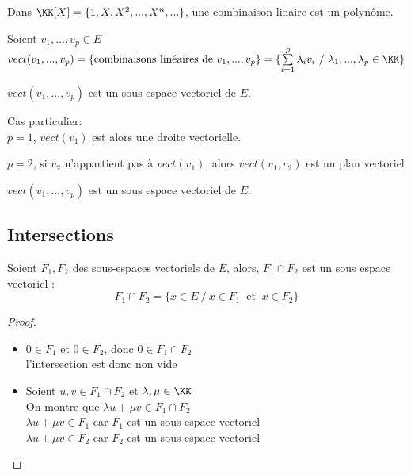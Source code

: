 \documentclass[../main.tex]{subfile}
\begin{document}
\begin{ex}
	Dans $\KK[X] = \{1, X, X^2, ..., X^n, ...\}$, une combinaison linaire est un polynôme.
\end{ex}

\begin{defi}
	Soient $v_1, ..., v_p \in E$\\
	$vect(v_1, ..., v_p) = \{\text{combinaisons linéaires de $v_1, ..., v_p$}\} = \{\sum\limits_{i=1}^p \lambda_i v_i \ / \ \lambda_1, ..., \lambda_p \in \KK\}$
\end{defi}

\begin{prop}
	$vect(v_1, ..., v_p)$ est un sous espace vectoriel de $E$.
\end{prop}

\begin{ex}
	Cas particulier:\\
	$p = 1$, $vect(v_1)$ est alors une droite vectorielle.\\
\begin{center}	
	\def\svgwidth{0.3\textwidth}
	
\end{center}
	$p=2$, si $v_2$ n'appartient pas à $vect(v_1)$, alors $vect(v_1, v_2)$ est un plan vectoriel
\begin{center}	
	\def\svgwidth{0.3\textwidth}
	
\end{center}
\end{ex}

\begin{prop}
	$vect(v_1, ..., v_p)$ est un sous espace vectoriel de $E$.
\end{prop}

\subsection{Intersections}
\begin{prop}
	Soient $F_1, F_2$ des sous-espaces vectoriels de $E$, 
	alors, $F_1 \cap F_2$ est un sous espace vectoriel :
	$$F_1 \cap F_2 = \{x \in E \ / \ x \in F_1 \ \text{ et } \ x \in F_2\}$$
\end{prop}

\begin{proof}
\begin{itemize}	
	\item $0 \in F_1$ et $0 \in F_2$, donc $0 \in F_1 \cap F_2$\\
	l'intersection est donc non vide

	\item Soient $u, v \in F_1 \cap F_2$ et $\lambda, \mu \in \KK$\\
	On montre que $\lambda u + \mu v \in F_1 \cap F_2$\\
	$\lambda u + \mu v \in F_1$ car $F_1$ est un sous espace vectoriel\\
	$\lambda u + \mu v \in F_2$ car $F_2$ est un sous espace vectoriel\\
\end{itemize}
\end{proof}
\end{document}
